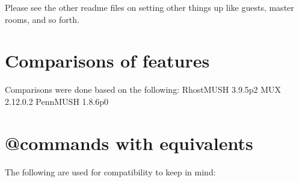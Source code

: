 \documentclass[letterpaper,10pt,english]{sphinxmanual}
\begin{document}
\sphinxAtStartPar
Please see the other readme files on setting other things up like
guests, master rooms, and so forth.


\section{Comparisons of features}
\label{\detokenize{differences:comparisons-of-features}}
\sphinxAtStartPar
Comparisons were done based on the following:
RhostMUSH 3.9.5p2
MUX 2.12.0.2
PennMUSH 1.8.6p0


\section{@commands with equivalents}
\label{\detokenize{differences:commands-with-equivalents}}
\sphinxAtStartPar
The following are used for compatibility to keep in mind:
\end{document}
